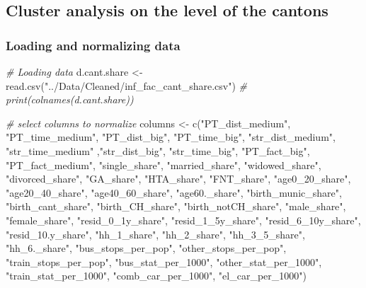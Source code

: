 \documentclass[
]{article}
\newenvironment{Shaded}{\begin{snugshade}}{\end{snugshade}}
\newcommand{\CommentTok}[1]{\textcolor[rgb]{0.56,0.35,0.01}{\textit{#1}}}
\newcommand{\FunctionTok}[1]{\textcolor[rgb]{0.00,0.00,0.00}{#1}}
\newcommand{\NormalTok}[1]{#1}
\newcommand{\OtherTok}[1]{\textcolor[rgb]{0.56,0.35,0.01}{#1}}
\newcommand{\StringTok}[1]{\textcolor[rgb]{0.31,0.60,0.02}{#1}}
\begin{document}
\hypertarget{cluster-analysis-on-the-level-of-the-cantons}{%
\subsection{Cluster analysis on the level of the
cantons}\label{cluster-analysis-on-the-level-of-the-cantons}}

\hypertarget{loading-and-normalizing-data}{%
\subsubsection{Loading and normalizing
data}\label{loading-and-normalizing-data}}

\begin{Shaded}
\begin{Highlighting}[]
\CommentTok{\# Loading data}
\NormalTok{d.cant.share }\OtherTok{\textless{}{-}} \FunctionTok{read.csv}\NormalTok{(}\StringTok{"../Data/Cleaned/inf\_fac\_cant\_share.csv"}\NormalTok{)}
\CommentTok{\# print(colnames(d.cant.share))}

\CommentTok{\# select columns to normalize}
\NormalTok{columns }\OtherTok{\textless{}{-}} \FunctionTok{c}\NormalTok{(}\StringTok{"PT\_dist\_medium"}\NormalTok{, }\StringTok{"PT\_time\_medium"}\NormalTok{, }\StringTok{"PT\_dist\_big"}\NormalTok{, }\StringTok{"PT\_time\_big"}\NormalTok{,}
             \StringTok{"str\_dist\_medium"}\NormalTok{, }\StringTok{"str\_time\_medium"}\NormalTok{ ,}\StringTok{"str\_dist\_big"}\NormalTok{, }\StringTok{"str\_time\_big"}\NormalTok{,}
             \StringTok{"PT\_fact\_big"}\NormalTok{, }\StringTok{"PT\_fact\_medium"}\NormalTok{, }\StringTok{"single\_share"}\NormalTok{, }\StringTok{"married\_share"}\NormalTok{, }
             \StringTok{"widowed\_share"}\NormalTok{, }\StringTok{"divorced\_share"}\NormalTok{, }\StringTok{"GA\_share"}\NormalTok{, }\StringTok{"HTA\_share"}\NormalTok{,}
             \StringTok{"FNT\_share"}\NormalTok{, }\StringTok{"age0\_20\_share"}\NormalTok{, }\StringTok{"age20\_40\_share"}\NormalTok{, }\StringTok{"age40\_60\_share"}\NormalTok{,}
             \StringTok{"age60.\_share"}\NormalTok{, }\StringTok{"birth\_munic\_share"}\NormalTok{, }\StringTok{"birth\_cant\_share"}\NormalTok{, }
             \StringTok{"birth\_CH\_share"}\NormalTok{, }\StringTok{"birth\_notCH\_share"}\NormalTok{, }\StringTok{"male\_share"}\NormalTok{, }\StringTok{"female\_share"}\NormalTok{,}
             \StringTok{"resid\_0\_1y\_share"}\NormalTok{, }\StringTok{"resid\_1\_5y\_share"}\NormalTok{, }\StringTok{"resid\_6\_10y\_share"}\NormalTok{, }
             \StringTok{"resid\_10.y\_share"}\NormalTok{, }\StringTok{"hh\_1\_share"}\NormalTok{, }\StringTok{"hh\_2\_share"}\NormalTok{, }\StringTok{"hh\_3\_5\_share"}\NormalTok{, }
             \StringTok{"hh\_6.\_share"}\NormalTok{, }\StringTok{"bus\_stops\_per\_pop"}\NormalTok{, }\StringTok{"other\_stops\_per\_pop"}\NormalTok{, }
             \StringTok{"train\_stops\_per\_pop"}\NormalTok{, }\StringTok{"bus\_stat\_per\_1000"}\NormalTok{, }\StringTok{"other\_stat\_per\_1000"}\NormalTok{,}
             \StringTok{"train\_stat\_per\_1000"}\NormalTok{, }\StringTok{"comb\_car\_per\_1000"}\NormalTok{, }\StringTok{"el\_car\_per\_1000"}\NormalTok{)}


\end{Highlighting}
\end{Shaded}
\end{document}
